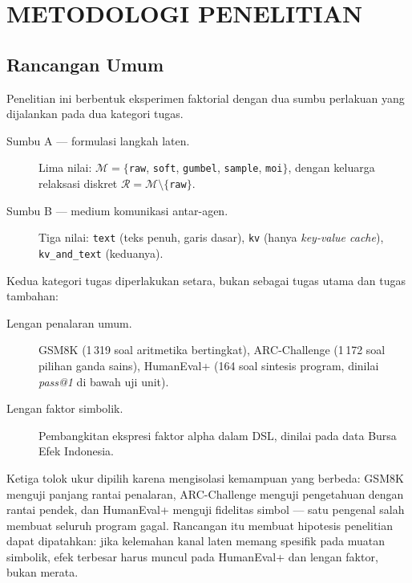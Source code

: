 \documentclass{laporanta1statugm}
\newcommand{\code}[1]{\texttt{#1}}
\begin{document}
\chapter{METODOLOGI PENELITIAN}

\section{Rancangan Umum}

Penelitian ini berbentuk eksperimen faktorial dengan dua sumbu perlakuan yang
dijalankan pada dua kategori tugas.

\begin{description}
  \item[Sumbu A --- formulasi langkah laten.] Lima nilai:
        $\mathcal{M} = \{$\code{raw}, \code{soft}, \code{gumbel}, \code{sample},
        \code{moi}$\}$, dengan keluarga relaksasi diskret
        $\mathcal{R} = \mathcal{M}\setminus\{$\code{raw}$\}$.
  \item[Sumbu B --- medium komunikasi antar-agen.] Tiga nilai:
        \code{text} (teks penuh, garis dasar), \code{kv} (hanya
        \textit{key-value cache}), \code{kv\_and\_text} (keduanya).
\end{description}

Kedua kategori tugas diperlakukan setara, bukan sebagai tugas utama dan tugas
tambahan:

\begin{description}
  \item[Lengan penalaran umum.] GSM8K (1\,319 soal aritmetika bertingkat),
        ARC-Challenge (1\,172 soal pilihan ganda sains), HumanEval+ (164 soal
        sintesis program, dinilai \textit{pass@1} di bawah uji unit).
  \item[Lengan faktor simbolik.] Pembangkitan ekspresi faktor alpha dalam DSL,
        dinilai pada data Bursa Efek Indonesia.
\end{description}

Ketiga tolok ukur dipilih karena mengisolasi kemampuan yang berbeda: GSM8K
menguji panjang rantai penalaran, ARC-Challenge menguji pengetahuan dengan
rantai pendek, dan HumanEval+ menguji fidelitas simbol --- satu pengenal salah
membuat seluruh program gagal. Rancangan itu membuat hipotesis penelitian dapat
dipatahkan: jika kelemahan kanal laten memang spesifik pada muatan simbolik,
efek terbesar harus muncul pada HumanEval+ dan lengan faktor, bukan merata.
\end{document}
